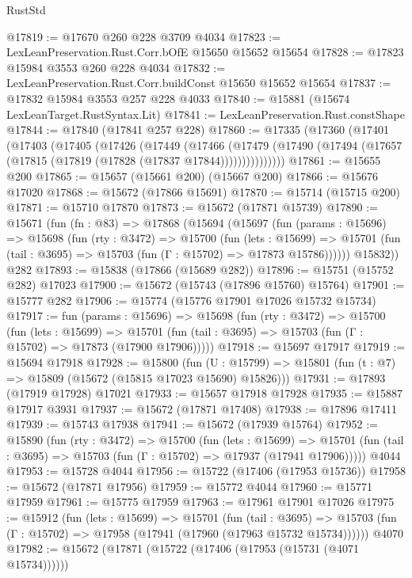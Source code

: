\begin{lexlean}{RustStd}
\begin{coremodule}
@17819 := @17670 @260 @228 @3709 @4034
@17823 := LexLeanPreservation.Rust.Corr.bOfE @15650 @15652 @15654
@17828 := @17823 @15984 @3553 @260 @228 @4034
@17832 := LexLeanPreservation.Rust.Corr.buildConst @15650 @15652 @15654
@17837 := @17832 @15984 @3553 @257 @228 @4033
@17840 := @15881 (@15674 LexLeanTarget.RustSyntax.Lit)
@17841 := LexLeanPreservation.Rust.constShape
@17844 := @17840 (@17841 @257 @228)
@17860 := @17335
    (@17360
      (@17401
        (@17403
          (@17405
            (@17426
              (@17449
                (@17466
                  (@17479
                    (@17490 (@17494 (@17657 (@17815 (@17819 (@17828 (@17837 @17844)))))))))))))))
@17861 := @15655 @200
@17865 := @15657 (@15661 @200) (@15667 @200)
@17866 := @15676 @17020
@17868 := @15672 (@17866 @15691)
@17870 := @15714 (@15715 @200)
@17871 := @15710 @17870
@17873 := @15672 (@17871 @15739)
@17890 := @15671
    (fun (fn : @83) =>
    @17868
      (@15694
        (@15697
          (fun (params : @15696) =>
          @15698
            (fun (rty : @3472) =>
            @15700
              (fun (lets : @15699) =>
              @15701 (fun (tail : @3695) => @15703 (fun (Γ : @15702) => @17873 @15786))))))
        @15832))
    @282
@17893 := @15838 (@17866 (@15689 @282))
@17896 := @15751 (@15752 @282) @17023
@17900 := @15672 (@15743 (@17896 @15760) @15764)
@17901 := @15777 @282
@17906 := @15774 (@15776 @17901 @17026 @15732 @15734)
@17917 := fun (params : @15696) =>
  @15698
    (fun (rty : @3472) =>
    @15700
      (fun (lets : @15699) =>
      @15701 (fun (tail : @3695) => @15703 (fun (Γ : @15702) => @17873 (@17900 @17906)))))
@17918 := @15697 @17917
@17919 := @15694 @17918
@17928 := @15800
    (fun (U : @15799) => @15801 (fun (t : @7) => @15809 (@15672 (@15815 @17023 @15690) @15826)))
@17931 := @17893 (@17919 @17928) @17021
@17933 := @15657 @17918 @17928
@17935 := @15887 @17917 @3931
@17937 := @15672 (@17871 @17408)
@17938 := @17896 @17411
@17939 := @15743 @17938
@17941 := @15672 (@17939 @15764)
@17952 := @15890
    (fun (rty : @3472) =>
    @15700
      (fun (lets : @15699) =>
      @15701 (fun (tail : @3695) => @15703 (fun (Γ : @15702) => @17937 (@17941 @17906)))))
    @4044
@17953 := @15728 @4044
@17956 := @15722 (@17406 (@17953 @15736))
@17958 := @15672 (@17871 @17956)
@17959 := @15772 @4044
@17960 := @15771 @17959
@17961 := @15775 @17959
@17963 := @17961 @17901 @17026
@17975 := @15912
    (fun (lets : @15699) =>
    @15701
      (fun (tail : @3695) =>
      @15703 (fun (Γ : @15702) => @17958 (@17941 (@17960 (@17963 @15732 @15734))))))
    @4070
@17982 := @15672 (@17871 (@15722 (@17406 (@17953 (@15731 (@4071 @15734))))))

\end{coremodule}
\end{lexlean}
